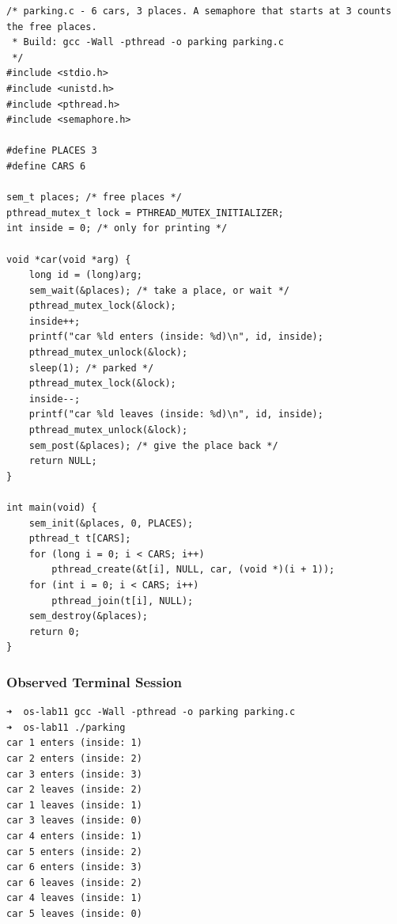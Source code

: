 \documentclass{labreport}
\begin{document}
\begin{lstlisting}[style=c]
/* parking.c - 6 cars, 3 places. A semaphore that starts at 3 counts the free places.
 * Build: gcc -Wall -pthread -o parking parking.c
 */
#include <stdio.h>
#include <unistd.h>
#include <pthread.h>
#include <semaphore.h>

#define PLACES 3
#define CARS 6

sem_t places; /* free places */
pthread_mutex_t lock = PTHREAD_MUTEX_INITIALIZER;
int inside = 0; /* only for printing */

void *car(void *arg) {
    long id = (long)arg;
    sem_wait(&places); /* take a place, or wait */
    pthread_mutex_lock(&lock);
    inside++;
    printf("car %ld enters (inside: %d)\n", id, inside);
    pthread_mutex_unlock(&lock);
    sleep(1); /* parked */
    pthread_mutex_lock(&lock);
    inside--;
    printf("car %ld leaves (inside: %d)\n", id, inside);
    pthread_mutex_unlock(&lock);
    sem_post(&places); /* give the place back */
    return NULL;
}

int main(void) {
    sem_init(&places, 0, PLACES);
    pthread_t t[CARS];
    for (long i = 0; i < CARS; i++)
        pthread_create(&t[i], NULL, car, (void *)(i + 1));
    for (int i = 0; i < CARS; i++)
        pthread_join(t[i], NULL);
    sem_destroy(&places);
    return 0;
}
\end{lstlisting}

\subsubsection{Observed Terminal Session}
\begin{lstlisting}[style=bash]
➜  os-lab11 gcc -Wall -pthread -o parking parking.c
➜  os-lab11 ./parking
car 1 enters (inside: 1)
car 2 enters (inside: 2)
car 3 enters (inside: 3)
car 2 leaves (inside: 2)
car 1 leaves (inside: 1)
car 3 leaves (inside: 0)
car 4 enters (inside: 1)
car 5 enters (inside: 2)
car 6 enters (inside: 3)
car 6 leaves (inside: 2)
car 4 leaves (inside: 1)
car 5 leaves (inside: 0)
\end{lstlisting}
\end{document}
